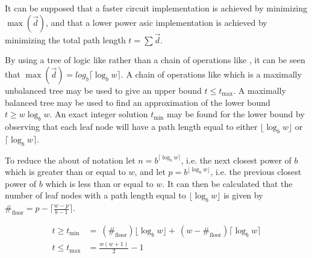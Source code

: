 \documentclass[11pt,twoside]{article}
\begin{document}
It can be supposed that a faster circuit implementation is achieved by
minimizing $\max(\vec{d})$, and that a lower power \gls{asic} implementation
is achieved by minimizing the total path length $t = \sum \vec{d}$.

By using a tree of logic like  rather than a chain of
operations like , it can be seen that
$\max(\vec{d}) = log_b\lceil \log_bw \rceil$.
A chain of operations like  which is a maximally
unbalanced tree may be used to give an upper bound $t \leq t_{\text{max}}$.
A maximally balanced tree may be used to find an approximation of the lower
bound $t \geq w\log_bw$.
An exact integer solution $t_{\text{min}}$ may be found for the lower bound by
observing that each leaf node will have a path length equal to either
$\lfloor \log_bw \rfloor$ or $\lceil \log_bw \rceil$.

To reduce the about of notation let $n = b^{\lceil \log_bw \rceil}$, i.e. the
next closest power of $b$ which is greater than or equal to $w$, and let
$p = b^{\lfloor \log_bw \rfloor}$, i.e. the previous closest power of $b$
which is less than or equal to $w$.
It can then be calculated that the number of leaf nodes with a path length
equal to $\lfloor \log_bw \rfloor$ is given by
$\#_{\text{floor}}=p-\lceil \frac{w-p}{b-1} \rceil$.

\begin{align}
\label{eq:t_lower}
t \geq t_{\text{min}} &= \
(\#_{\text{floor}})\lfloor \log_bw \rfloor + \
(w-\#_{\text{floor}})\lceil \log_bw \rceil \\
\label{eq:t_upper}
t \leq t_{\text{max}} &= \frac{w(w+1)}{2}-1
\end{align}
\end{document}
